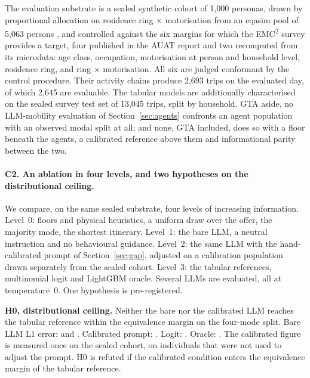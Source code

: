 The evaluation substrate is a sealed synthetic cohort of 1,000 personas, %
drawn by proportional allocation on residence ring $\times$ motorisation from an eqasim pool of 5,063 persons \citep{horl2021eqasim}, and controlled against the six margins for which the EMC\textsuperscript{2} survey provides a target, four published in the AUAT report and two recomputed from its microdata: age class, occupation, motorisation at person and household level, residence ring, and ring $\times$ motorisation. All six are judged conformant by the control procedure. %
Their activity chains produce 2,693 trips on the evaluated day, of which 2,645 are evaluable. %
The tabular models are additionally characterised on the sealed survey test set of 13,045 trips, split by household. %
GTA aside, no LLM-mobility evaluation of Section~\ref{sec:agents} confronts an agent population with an observed modal split at all; and none, GTA included, does so with a floor beneath the agents, a calibrated reference above them and informational parity between the two.

\paragraph{C2. An ablation in four levels, and two hypotheses on the distributional ceiling.}
We compare, on the same sealed substrate, four levels of increasing information. Level~0: floors and physical heuristics, a uniform draw over the offer, the majority mode, the shortest itinerary. Level~1: the bare LLM, a neutral instruction and no behavioural guidance. Level~2: the same LLM with the hand-calibrated prompt of Section~\ref{sec:gap}, adjusted on a calibration population drawn separately from the sealed cohort. Level~3: the tabular references, multinomial logit and LightGBM oracle. Several LLMs are evaluated, all at temperature~0. One hypothesis is pre-registered.

\textbf{H0, distributional ceiling.} Neither the bare nor the calibrated LLM reaches the tabular reference within the equivalence margin on the four-mode split. Bare LLM L1 error:  and . Calibrated prompt: . Logit: . Oracle: . The calibrated figure is measured once on the sealed cohort, on individuals that were not used to adjust the prompt. H0 is refuted if the calibrated condition enters the equivalence margin of the tabular reference.

